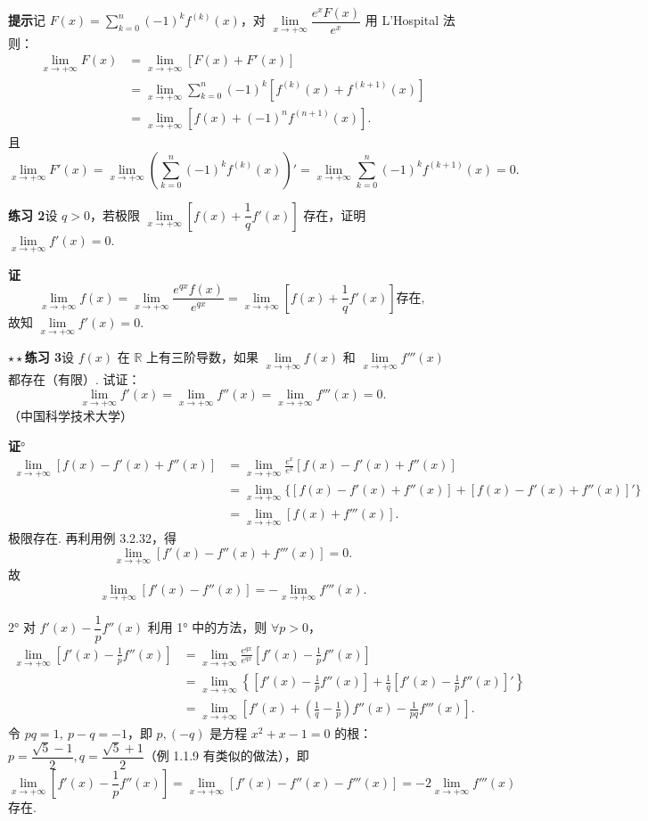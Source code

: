 \documentclass[UTF8,12pt,a4paper,fontset=fandol]{ctexart}
\begin{document}
\noindent\textbf{提示}\quad 记 $F(x)=\sum\limits_{k=0}^{n}(-1)^kf^{(k)}(x)$，对 $\lim\limits_{x\to+\infty}\dfrac{e^xF(x)}{e^x}$ 用 L'Hospital 法则：
\[
\begin{aligned}
  \lim_{x\to+\infty}F(x)
  &=\lim_{x\to+\infty}[F(x)+F'(x)] \\
  &=\lim_{x\to+\infty}
  \sum_{k=0}^{n}(-1)^k[f^{(k)}(x)+f^{(k+1)}(x)] \\
  &=\lim_{x\to+\infty}[f(x)+(-1)^nf^{(n+1)}(x)].
\end{aligned}
\]
且
\[
  \lim_{x\to+\infty}F'(x)
  =
  \lim_{x\to+\infty}\left(\sum_{k=0}^{n}(-1)^kf^{(k)}(x)\right)'
  =
  \lim_{x\to+\infty}\sum_{k=0}^{n}(-1)^kf^{(k+1)}(x)=0.
\]

\noindent\textbf{练习 2}\quad 设 $q>0$，若极限 $\lim\limits_{x\to+\infty}\left[f(x)+\dfrac{1}{q}f'(x)\right]$ 存在，证明 $\lim\limits_{x\to+\infty}f'(x)=0$.

\noindent\textbf{证}\quad
\[
  \lim_{x\to+\infty}f(x)
  =
  \lim_{x\to+\infty}\frac{e^{qx}f(x)}{e^{qx}}
  =
  \lim_{x\to+\infty}\left[f(x)+\frac{1}{q}f'(x)\right]\text{存在},
\]
故知 $\lim\limits_{x\to+\infty}f'(x)=0$.

\noindent\textbf{$\star\star$练习 3}\quad 设 $f(x)$ 在 $\mathbb{R}$ 上有三阶导数，如果 $\lim\limits_{x\to+\infty}f(x)$ 和 $\lim\limits_{x\to+\infty}f'''(x)$ 都存在（有限）. 试证：
\[
  \lim_{x\to+\infty}f'(x)=\lim_{x\to+\infty}f''(x)=\lim_{x\to+\infty}f'''(x)=0.
\]
（中国科学技术大学）

\noindent\textbf{证}°
\[
\begin{aligned}
  \lim_{x\to+\infty}[f(x)-f'(x)+f''(x)]
  &=
  \lim_{x\to+\infty}\frac{e^x}{e^x}[f(x)-f'(x)+f''(x)] \\
  &=
  \lim_{x\to+\infty}\{[f(x)-f'(x)+f''(x)]+[f(x)-f'(x)+f''(x)]'\} \\
  &=\lim_{x\to+\infty}[f(x)+f'''(x)].
\end{aligned}
\tag{1}
\]
极限存在. 再利用例 3.2.32，得
\[
  \lim_{x\to+\infty}[f'(x)-f''(x)+f'''(x)]=0.
\tag{2}
\]
故
\[
  \lim_{x\to+\infty}[f'(x)-f''(x)]
  =
  -\lim_{x\to+\infty}f'''(x).
\tag{3}
\]

2° 对 $f'(x)-\dfrac1p f''(x)$ 利用 1° 中的方法，则 $\forall p>0$，
\[
\begin{aligned}
  \lim_{x\to+\infty}\left[f'(x)-\frac1p f''(x)\right]
  &=
  \lim_{x\to+\infty}\frac{e^{qx}}{e^{qx}}\left[f'(x)-\frac1p f''(x)\right] \\
  &=
  \lim_{x\to+\infty}\left\{
  \left[f'(x)-\frac1p f''(x)\right]
  +\frac1q\left[f'(x)-\frac1p f''(x)\right]'\right\} \\
  &=
  \lim_{x\to+\infty}\left[f'(x)+\left(\frac1q-\frac1p\right)f''(x)-\frac1{pq}f'''(x)\right].
\end{aligned}
\]
令 $pq=1,\ p-q=-1$，即 $p,(-q)$ 是方程 $x^2+x-1=0$ 的根：$p=\dfrac{\sqrt5-1}{2},q=\dfrac{\sqrt5+1}{2}$（例 1.1.9 有类似的做法），即
\[
  \lim_{x\to+\infty}\left[f'(x)-\frac1p f''(x)\right]
  =
  \lim_{x\to+\infty}[f'(x)-f''(x)-f'''(x)]
  =
  -2\lim_{x\to+\infty}f'''(x)
\tag{4}
\]
存在.
\end{document}
